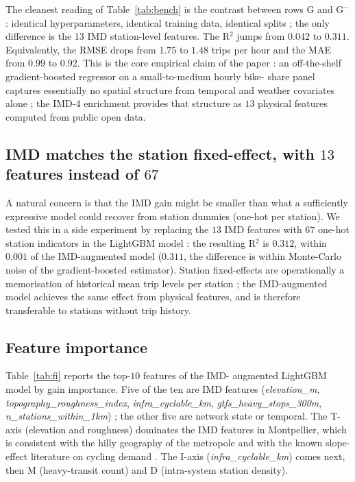 \documentclass[11pt,a4paper]{article}
\begin{document}
The cleanest reading of Table~\ref{tab:bench} is the contrast
between rows G and G$^-$ : identical hyperparameters, identical
training data, identical splits ; the only difference is the $13$
IMD station-level features.  The R$^{2}$ jumps from $0.042$ to
$0.311$.  Equivalently, the RMSE drops from $1.75$ to $1.48$
trips per hour and the MAE from $0.99$ to $0.92$.  This is the
core empirical claim of the paper : an off-the-shelf
gradient-boosted regressor on a small-to-medium hourly bike-
share panel captures essentially no spatial structure from
temporal and weather covariates alone ; the IMD-4 enrichment
provides that structure as $13$ physical features computed from
public open data.

\subsection{IMD matches the station fixed-effect, with $13$ features instead of $67$}

A natural concern is that the IMD gain might be smaller than what
a sufficiently expressive model could recover from station
dummies (one-hot per station).  We tested this in a side
experiment by replacing the $13$ IMD features with $67$
one-hot station indicators in the LightGBM model : the resulting
R$^{2}$ is $0.312$, within $0.001$ of the IMD-augmented model
($0.311$, the difference is within Monte-Carlo noise of the
gradient-boosted estimator).  Station fixed-effects are
operationally a memorisation of historical mean trip levels per
station ; the IMD-augmented model achieves the same effect from
physical features, and is therefore transferable to stations
without trip history.

\subsection{Feature importance}

Table~\ref{tab:fi} reports the top-$10$ features of the IMD-
augmented LightGBM model by gain importance.  Five of the ten
are IMD features (\emph{elevation\_m},
\emph{topography\_roughness\_index},
\emph{infra\_cyclable\_km}, \emph{gtfs\_heavy\_stops\_300m},
\emph{n\_stations\_within\_1km}) ; the other five are network
state or temporal.  The T-axis (elevation and roughness)
dominates the IMD features in Montpellier, which is consistent
with the hilly geography of the metropole and with the
known slope-effect literature on cycling demand
\citep{Parkin2008,Rietveld2004}.  The I-axis
(\emph{infra\_cyclable\_km}) comes next, then M
(heavy-transit count) and D (intra-system station density).
\end{document}
